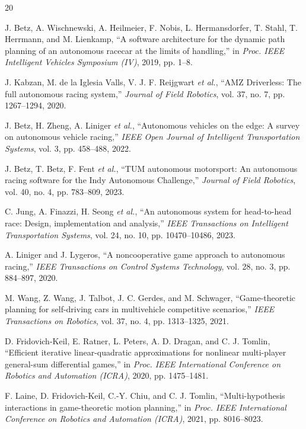 \begin{thebibliography}{20}

J. Betz, A. Wischnewski, A. Heilmeier, F. Nobis, L. Hermansdorfer,
T. Stahl, T. Herrmann, and M. Lienkamp,
``A software architecture for the dynamic path planning of an autonomous
racecar at the limits of handling,'' in \emph{Proc. IEEE Intelligent Vehicles
Symposium (IV)}, 2019, pp. 1--8.

J. Kabzan, M. de la Iglesia Valls, V. J. F. Reijgwart \emph{et al.},
``AMZ Driverless: The full autonomous racing system,''
\emph{Journal of Field Robotics}, vol. 37, no. 7, pp. 1267--1294, 2020.

J. Betz, H. Zheng, A. Liniger \emph{et al.},
``Autonomous vehicles on the edge: A survey on autonomous vehicle racing,''
\emph{IEEE Open Journal of Intelligent Transportation Systems}, vol. 3,
pp. 458--488, 2022.

J. Betz, T. Betz, F. Fent \emph{et al.},
``TUM autonomous motorsport: An autonomous racing software for the Indy
Autonomous Challenge,'' \emph{Journal of Field Robotics}, vol. 40, no. 4,
pp. 783--809, 2023.

C. Jung, A. Finazzi, H. Seong \emph{et al.},
``An autonomous system for head-to-head race: Design, implementation and
analysis,'' \emph{IEEE Transactions on Intelligent Transportation Systems},
vol. 24, no. 10, pp. 10470--10486, 2023.

A. Liniger and J. Lygeros,
``A noncooperative game approach to autonomous racing,''
\emph{IEEE Transactions on Control Systems Technology}, vol. 28, no. 3,
pp. 884--897, 2020.

M. Wang, Z. Wang, J. Talbot, J. C. Gerdes, and M. Schwager,
``Game-theoretic planning for self-driving cars in multivehicle competitive
scenarios,'' \emph{IEEE Transactions on Robotics}, vol. 37, no. 4,
pp. 1313--1325, 2021.

D. Fridovich-Keil, E. Ratner, L. Peters, A. D. Dragan, and C. J. Tomlin,
``Efficient iterative linear-quadratic approximations for nonlinear
multi-player general-sum differential games,'' in \emph{Proc. IEEE
International Conference on Robotics and Automation (ICRA)}, 2020,
pp. 1475--1481.

F. Laine, D. Fridovich-Keil, C.-Y. Chiu, and C. J. Tomlin,
``Multi-hypothesis interactions in game-theoretic motion planning,'' in
\emph{Proc. IEEE International Conference on Robotics and Automation (ICRA)},
2021, pp. 8016--8023.


\end{thebibliography}
